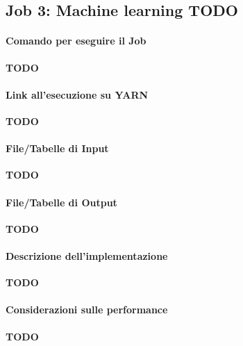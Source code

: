 

\subsection[%
    Job 3: Machine learning%
  ]{%
    Job 3: Machine learning \textbf{TODO}%
  }\label{subsec:job3}

  \paragraph{Comando per eseguire il Job}\label{par:job3:cmd}

  \textbf{TODO}

  \paragraph{Link all'esecuzione su YARN}\label{par:job3:yarn}

  \textbf{TODO}

  \paragraph{File/Tabelle di Input}\label{par:job3:input}

  \textbf{TODO}

  \paragraph{File/Tabelle di Output}\label{par:job3:output}

  \textbf{TODO}

  \paragraph{Descrizione dell'implementazione}\label{par:job3:implementation}

  \textbf{TODO}

  \paragraph{Considerazioni sulle performance}\label{par:job3:performance}

  \textbf{TODO}

